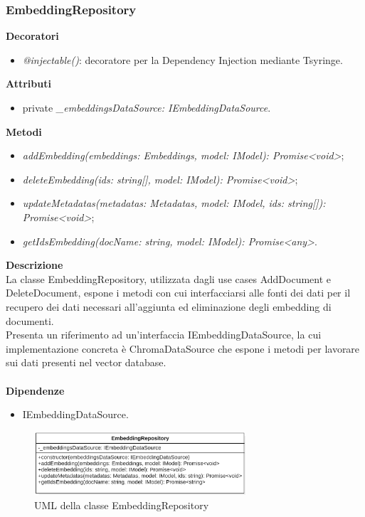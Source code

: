 \subsubsection{EmbeddingRepository}
\textbf{Decoratori}
\begin{itemize}
    \item \textit{@injectable()}: decoratore per la Dependency Injection mediante Tsyringe.
\end{itemize}
\textbf{Attributi}
\begin{itemize}
    \item private \textit{\_embeddingsDataSource: IEmbeddingDataSource}.
\end{itemize}
\textbf{Metodi}
\begin{itemize}[itemsep=-4pt]
    \item \textit{addEmbedding(embeddings: Embeddings, model: IModel): Promise<void>};
    \item \textit{deleteEmbedding(ids: string[], model: IModel): Promise<void>};
    \item \textit{updateMetadatas(metadatas: Metadatas, model: IModel, ids: string[]): Promise<void>};
    \item \textit{getIdsEmbedding(docName: string, model: IModel): Promise<any>}.
\end{itemize}
\textbf{Descrizione}\\
La classe EmbeddingRepository, utilizzata dagli use cases AddDocument e DeleteDocument, espone i metodi con cui interfacciarsi alle fonti dei dati per il recupero dei dati necessari all'aggiunta ed eliminazione degli embedding di documenti.\\
Presenta un riferimento ad un'interfaccia IEmbeddingDataSource, la cui implementazione concreta è ChromaDataSource che espone i metodi per lavorare sui dati presenti nel vector database.\\ \\
\textbf{Dipendenze}
\begin{itemize}
    \item IEmbeddingDataSource.
\end{itemize}

\begin{figure}[h!]
    \centering  
    \includegraphics[width=0.7\textwidth]{EmbeddingRepository.png}
    \caption{UML della classe EmbeddingRepository}
\end{figure}

